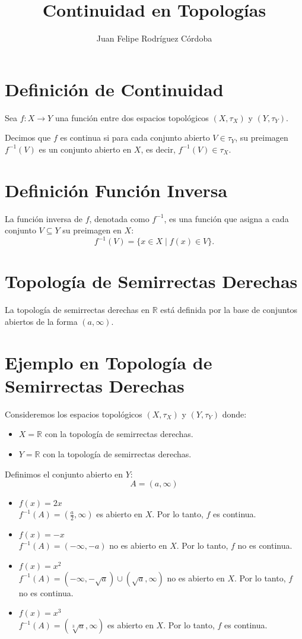 \documentclass[fleqn]{article}
\title{Continuidad en Topologías}
\author{Juan Felipe Rodríguez Córdoba}
\date{}
\begin{document}
	\maketitle
    \section*{Definición de Continuidad}
    Sea \( f: X \to Y \) una función entre dos espacios topológicos \( (X, \tau_X) \) y \( (Y, \tau_Y) \).
    
    Decimos que \( f \) es continua si para cada conjunto abierto \( V \in \tau_Y \), su preimagen \( f^{-1}(V) \) es un conjunto abierto en \( X \), es decir, \( f^{-1}(V) \in \tau_X \).

    \section*{Definición Función Inversa}
    La función inversa de \( f \), denotada como \( f^{-1} \), es una función que asigna a cada conjunto \( V \subseteq Y \) su preimagen en \( X \):
    \[ f^{-1}(V) = \{ x \in X \mid f(x) \in V \}. \]

    \section*{Topología de Semirrectas Derechas}
    La topología de semirrectas derechas en \( \mathbb{R} \) está definida por la base de conjuntos abiertos de la forma \( (a, \infty) \).

    \section*{Ejemplo en Topología de Semirrectas Derechas}
    Consideremos los espacios topológicos \( (X, \tau_X) \) y \( (Y, \tau_Y) \) donde:
    \begin{itemize}
        \item \( X = \mathbb{R} \) con la topología de semirrectas derechas.
        \item \( Y = \mathbb{R} \) con la topología de semirrectas derechas.
    \end{itemize}
    Definimos el conjunto abierto en \( Y \):
    \[ A = (a, \infty) \]
    \begin{itemize}
        \item \(f(x) = 2x\) \\
        \(f^{-1}(A) = (\frac{a}{2}, \infty)\) es abierto en \( X \). Por lo tanto, \( f \) es continua.
        \item \(f(x) = -x\) \\
        \(f^{-1}(A) = (-\infty, -a)\) no es abierto en \( X \). Por lo tanto, \( f \) no es continua.
        \item \(f(x) = x^2\) \\
        \(f^{-1}(A) = (-\infty, -\sqrt{a}) \cup (\sqrt{a}, \infty)\) no es abierto en \( X \). Por lo tanto, \( f \) no es continua.
        \item \(f(x) = x^3\) \\
        \(f^{-1}(A) = (\sqrt[3]{a}, \infty)\) es abierto en \( X \). Por lo tanto, \( f \) es continua.
    \end{itemize}
\end{document}

